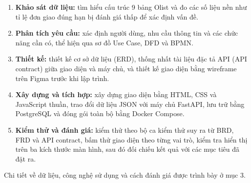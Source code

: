 \begin{enumerate}
    \item \textbf{Khảo sát dữ liệu:} tìm hiểu cấu trúc 9 bảng Olist và đo các số liệu nền
    như tỉ lệ đơn giao đúng hạn bị đánh giá thấp để xác định vấn đề.
    \item \textbf{Phân tích yêu cầu:} xác định người dùng, nhu cầu thông tin và các chức năng
    cần có, thể hiện qua sơ đồ Use Case, DFD và BPMN.
    \item \textbf{Thiết kế:} thiết kế cơ sở dữ liệu (ERD), thống nhất tài liệu đặc tả API (API
    contract) giữa giao diện và máy chủ, và thiết kế giao diện bằng wireframe trên Figma trước khi
    lập trình.
    \item \textbf{Xây dựng và tích hợp:} xây dựng giao diện bằng HTML, CSS và JavaScript thuần,
    trao đổi dữ liệu JSON với máy chủ FastAPI, lưu trữ bằng PostgreSQL và đóng gói toàn bộ bằng
    Docker Compose.
    \item \textbf{Kiểm thử và đánh giá:} kiểm thử theo bộ ca kiểm thử suy ra từ BRD, FRD và API
    contract, bấm thử giao diện theo từng vai trò, kiểm tra hiển thị trên ba kích thước màn hình,
    sau đó đối chiếu kết quả với các mục tiêu đã đặt ra.
\end{enumerate}

Chi tiết về dữ liệu, công nghệ sử dụng và cách đánh giá được trình bày ở mục 3.
